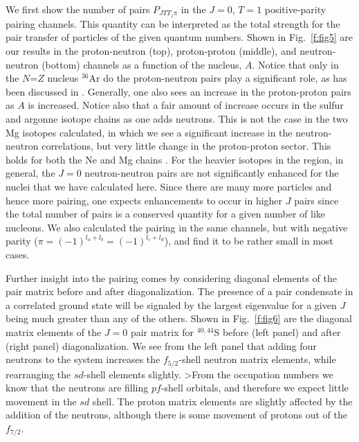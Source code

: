 \begin{multicols}{2}
We first show the number of pairs $P_{JTT_z\pi}$ in the
$J=0$, $T=1$ positive-parity pairing channels. This quantity can be
interpreted as the total strength for the pair transfer of particles
of the given quantum numbers.
Shown in Fig.~\ref{f:fig5} are our results in the proton-neutron
(top), proton-proton (middle), and neutron-neutron (bottom) channels as
a function of the nucleus, $A$. Notice that only in the $N$=$Z$ nucleus
$^{36}$Ar do the proton-neutron pairs play a significant role, as
has been discussed in \cite{r:langanke}. Generally, one also sees
an increase in the proton-proton pairs as $A$ is increased. Notice
also that a fair amount of increase occurs in the sulfur and argonne
isotope chains as one adds neutrons. This is not the case in the
two Mg isotopes calculated, in which we see a significant increase
in the neutron-neutron correlations, but very little change in
the proton-proton sector. This holds for both the Ne and Mg chains
\cite{dean98}.  For the heavier isotopes in the
region, in general, the $J=0$
neutron-neutron pairs are not significantly enhanced for the
nuclei that we have calculated here. Since there are many
more particles and hence more pairing, one expects enhancements
to occur in higher $J$ pairs since the total number of pairs is
a conserved quantity for a given number of like nucleons.
We also calculated the pairing in the same channels, but with negative
parity ($\pi = (-1)^{l_a + l_b} = (-1)^{l_c + l_d}$),
and find it to be rather small in most cases.

Further insight into the pairing comes by considering diagonal
elements of the pair matrix before and after diagonalization.
The presence of a pair condensate in a correlated ground state will
be signaled by the largest eigenvalue for a given $J$ being
much greater than any of the others.
Shown in Fig.~\ref{f:fig6} are the diagonal matrix elements
of the $J=0$ pair matrix for $^{40,44}$S
before (left panel) and after (right panel) diagonalization.
We see from the left panel that adding four neutrons to the system
increases the $f_{5/2}$-shell neutron matrix elements,
while rearranging the
$sd$-shell elements slightly.
>From the occupation numbers we know that the neutrons are filling
$pf$-shell orbitals, and therefore we expect little movement
in the $sd$ shell.
The proton matrix elements are slightly affected by
the addition of the neutrons, although there is
some movement of protons out of the $f_{7/2}$.


\end{multicols}
